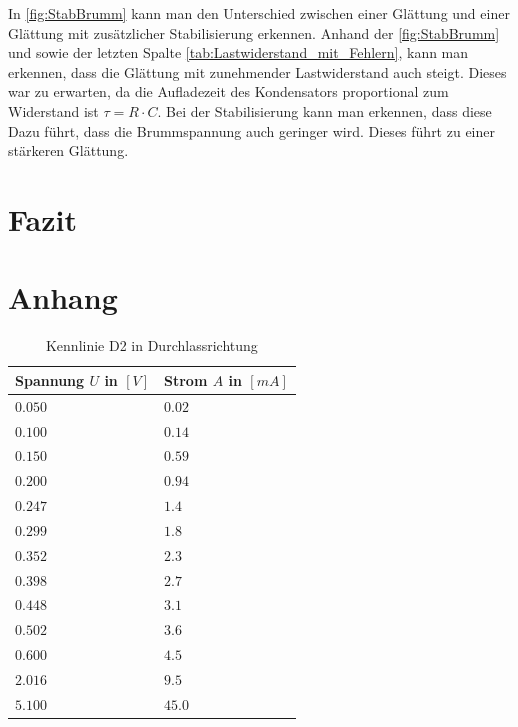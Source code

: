 \documentclass{article}
\theoremstyle{definition}
\begin{document}
In \autoref{fig:StabBrumm} kann man den Unterschied zwischen einer Glättung und einer Glättung mit zusätzlicher Stabilisierung erkennen. Anhand der \autoref{fig:StabBrumm} und sowie der letzten Spalte \autoref{tab:Lastwiderstand_mit_Fehlern}, kann man erkennen, dass die Glättung mit zunehmender Lastwiderstand auch steigt. Dieses war zu erwarten, da die Aufladezeit des Kondensators proportional zum Widerstand ist $\tau = R \cdot C$. Bei der Stabilisierung kann man erkennen, dass diese Dazu führt, dass die Brummspannung auch geringer wird. Dieses führt zu einer stärkeren Glättung.






\section{Fazit}




\section{Anhang}

    
\begin{table}[h!]
    \centering
    \begin{tabular}{|l|l|}
    \hline
    \textbf{Spannung $U$ in $[V]$} & \textbf{Strom $A$ in $[mA]$} \\
    \hline
    $0.050$ & $0.02$ \\
    $0.100$ & $0.14$ \\
    $0.150$ & $0.59$ \\
    $0.200$ & $0.94$\\
    $0.247$ & $1.4$ \\
    $0.299$ & $1.8$ \\
    $0.352$ & $2.3$ \\
    $0.398$ & $2.7$\\
    $0.448$ & $3.1$ \\
    $0.502$ & $3.6$ \\
    $0.600$ & $4.5$ \\
    $2.016$ & $9.5$ \\
    $5.100$ & $45.0$ \\
    \hline
    \end{tabular}
    \caption{Kennlinie D2 in Durchlassrichtung}
    \label{tab:D2duchlass}
    \end{table}
    
\end{document}
